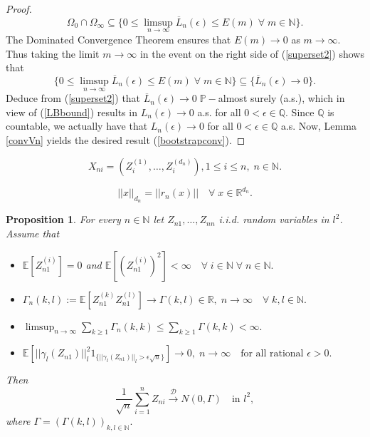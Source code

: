 \documentclass[10pt,a4paper]{amsart}
\newtheorem{proposition}{Proposition}
\begin{document}
\begin{proof}
\begin{equation}
 \Omega_0 \cap \Omega_\infty \subseteq \{ 0 \le \limsup_{n \rightarrow \infty} \overline{L}_n(\epsilon) \le E(m) \; \forall \; m \in \mathbb{N}\}.
\end{equation}
The Dominated Convergence Theorem ensures that $E(m) \rightarrow 0$ as $m \rightarrow \infty$. Thus taking the limit $m \rightarrow \infty$ in the event on the right side of (\ref{superset2}) shows that
$$
\{ 0 \le \limsup_{n \rightarrow \infty} \overline{L}_n(\epsilon) \le E(m) \; \forall \; m \in \mathbb{N}\} \subseteq \{\overline{L}_n(\epsilon) \rightarrow 0\}.
$$
Deduce from (\ref{superset2}) that $\overline{L}_n(\epsilon) \rightarrow 0 \; \mathbb{P}-$almost surely (a.s.), which in view of (\ref{LBbound}) results in
$L_n(\epsilon) \rightarrow 0$ a.s. for all $0<\epsilon \in \mathbb{Q}.$ Since $\mathbb{Q}$ is countable, we actually have
that $L_n(\epsilon) \rightarrow 0$ for all $0<\epsilon \in \mathbb{Q}$ a.s.
Now, Lemma \ref{convVn} yields the desired result (\ref{bootstrapconv}).
\end{proof}

\begin{equation} \label{arisesequence}
 X_{ni}=(Z_i^{(1)},\ldots,Z_i^{(d_n)}), 1 \le i \le n, \; n \in \mathbb{N}.
\end{equation}

\begin{equation} \label{norm}
 ||x||_{d_n}=||r_n(x)|| \quad \forall \; x \in \mathbb{R}^{d_n}.
\end{equation}

\begin{proposition} \label{CLTl2arrays} For every $n \in \mathbb{N}$ let $Z_{n1},\ldots,Z_{nn}$ i.i.d. random variables in $l^2$.
Assume that
\begin{itemize}
\item[(1)] $\mathbb{E}[Z_{n1}^{(i)}]=0$ and $\mathbb{E}[(Z_{n1}^{(i)})^2] < \infty \quad \forall \; i \in \mathbb{N} \; \forall \; n \in \mathbb{N}.$\\

\item[(2)] $\Gamma_n(k,l):= \mathbb{E}[Z_{n1}^{(k)} Z_{n1}^{(l)}] \rightarrow \Gamma(k,l) \in \mathbb{R}, \; n \rightarrow \infty \quad \forall \; k,l \in \mathbb{N}.$\\

\item[(3)] $\limsup_{n \rightarrow \infty} \sum_{k \ge 1} \Gamma_n(k,k) \le \sum_{k \ge 1} \Gamma(k,k) < \infty.$\\

\item[(4)] $\mathbb{E}[||\gamma_l(Z_{n1})||_l^2 1_{\{||\gamma_l(Z_{n1})||_l > \epsilon \sqrt{n}\}}] \rightarrow 0, \; n \rightarrow \infty \quad \text{for all rational } \epsilon>0.$\\
\end{itemize}
Then
\begin{equation} \label{CLTl2}
  \frac{1}{\sqrt{n}} \sum_{i=1}^n Z_{ni} \stackrel{\mathcal{D}}{\rightarrow} N(0,\Gamma) \quad \text{in } l^2,
\end{equation}
where $\Gamma= (\Gamma(k,l))_{k,l \in \mathbb{N}}.$
\end{proposition}
\end{document}
